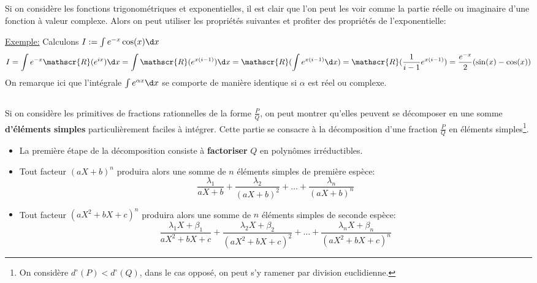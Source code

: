 \subsection*{}

Si on considère les fonctions trigonométriques et exponentielles, il est clair que l'on peut les voir comme la partie réelle ou imaginaire d'une fonction à valeur complexe.\+
Alors on peut utiliser les propriétés suivantes et profiter des propriétés de l'exponentielle:

\underline{Exemple:} Calculons \(I := \int e^{-x}\cos(x) \d x\)
\[
   I = \int e^{-x}\mathscr{R}(e^{ix}) \d x = \int \mathscr{R}(e^{x(i- 1)}) \d x = \mathscr{R}(\int e^{x(i - 1)} \d x) = \mathscr{R}(\frac{1}{i - 1}e^{x(i - 1)}) = \frac{e^{-x}}{2}(\sin(x) - \cos(x))
\]
On remarque ici que l'intégrale \(\int e^{\alpha x} \d x\) se comporte de manière identique si \(\alpha\) est réel ou complexe.

\subsection*{}

Si on considère les primitives de fractions rationnelles de la forme \(\frac{P}{Q}\), on peut montrer qu'elles peuvent se décomposer en une somme \textbf{d'éléments simples} particulièrement faciles à intégrer. Cette partie se consacre à la décomposition d'une fraction \(\frac{P}{Q}\) en éléments simples\footnote[1]{On considère \(d^{\circ}(P) < d^{\circ}(Q)\), dans le cas opposé, on peut s'y ramener par division euclidienne.}.
\begin{center}
   \begin{itemize}
      \item La première étape de la décomposition consiste à \textbf{factoriser} \(Q\) en polynômes irréductibles.
      \item Tout facteur \((aX + b)^n\) produira alors une somme de \(n\) éléments simples de première espèce:
      \[
         \frac{\lambda_1}{aX+b} + \frac{\lambda_2}{(aX+b)^2} + \ldots + \frac{\lambda_n}{(aX+b)^n}
      \] 
      \item Tout facteur \((aX^2 + bX + c)^n\) produira alors une somme de \(n\) éléments simples de seconde espèce:
      \[
         \frac{\lambda_1X+\beta_1}{aX^2+bX+c} + \frac{\lambda_2X+\beta_2}{(aX^2+bX+c)^2} + \ldots + \frac{\lambda_nX+\beta_n}{(aX^2+bX+c)^n}
      \]
   \end{itemize}
\end{center}

